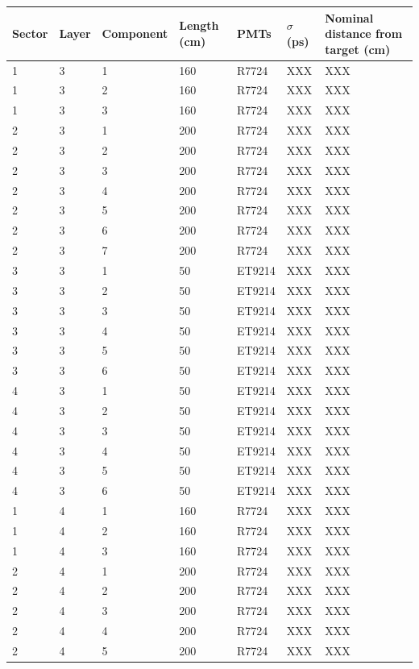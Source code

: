 \documentclass[3p,final,twocolumn]{elsarticle}
\begin{document}
\begin{table}[ht]
\begin{tabular}{  m{3em} | m{3em} | m{5em} | m{3em} | m{3em} | m{3em} | m{8em} }
		\hline
			Sector & Layer & Component & Length (\si{\centi\meter}) & PMTs  & $\sigma$ (\si{\pico\second}) & Nominal distance from target (\si{\centi\meter}) \\
		\hline
		\hline

1	&3	&1	&160	&R7724	&XXX	&XXX\\ 
1	&3	&2	&160	&R7724	&XXX	&XXX\\ 
1	&3	&3	&160	&R7724	&XXX	&XXX\\ 
2	&3	&1	&200	&R7724	&XXX	&XXX\\ 
2	&3	&2	&200	&R7724	&XXX	&XXX\\ 
2	&3	&3	&200	&R7724	&XXX	&XXX\\ 
2	&3	&4	&200	&R7724	&XXX	&XXX\\ 
2	&3	&5	&200	&R7724	&XXX	&XXX\\ 
2	&3	&6	&200	&R7724	&XXX	&XXX\\ 
2	&3	&7	&200	&R7724	&XXX	&XXX\\ 
3	&3	&1	&50	&ET9214	&XXX	&XXX\\ 
3	&3	&2	&50	&ET9214	&XXX	&XXX\\ 
3	&3	&3	&50	&ET9214	&XXX	&XXX\\ 
3	&3	&4	&50	&ET9214	&XXX	&XXX\\ 
3	&3	&5	&50	&ET9214	&XXX	&XXX\\ 
3	&3	&6	&50	&ET9214	&XXX	&XXX\\ 
4	&3	&1	&50	&ET9214	&XXX	&XXX\\ 
4	&3	&2	&50	&ET9214	&XXX	&XXX\\ 
4	&3	&3	&50	&ET9214	&XXX	&XXX\\ 
4	&3	&4	&50	&ET9214	&XXX	&XXX\\ 
4	&3	&5	&50	&ET9214	&XXX	&XXX\\ 
4	&3	&6	&50	&ET9214	&XXX	&XXX\\ 
1	&4	&1	&160	&R7724	&XXX	&XXX\\ 
1	&4	&2	&160	&R7724	&XXX	&XXX\\ 
1	&4	&3	&160	&R7724	&XXX	&XXX\\ 
2	&4	&1	&200	&R7724	&XXX	&XXX\\ 
2	&4	&2	&200	&R7724	&XXX	&XXX\\ 
2	&4	&3	&200	&R7724	&XXX	&XXX\\ 
2	&4	&4	&200	&R7724	&XXX	&XXX\\ 
2	&4	&5	&200	&R7724	&XXX	&XXX\\ 

\end{tabular}
\end{table}
\end{document}
